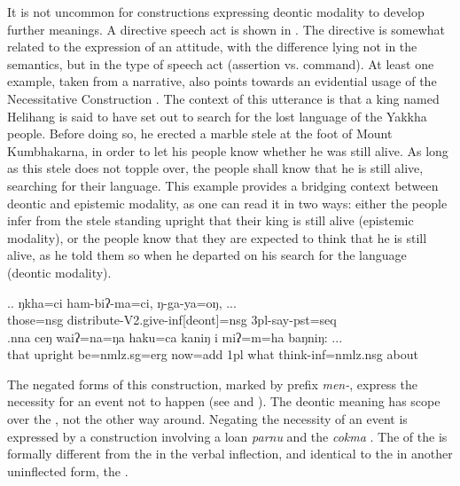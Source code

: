 	
It is not uncommon for constructions expressing deontic modality to develop further meanings. A directive speech act is shown in  \Next[a]. The directive is somewhat related to the expression of an attitude, with the difference lying not in the semantics, but in the type of speech act (assertion vs. command). At least one example, taken from a narrative, also points towards an evidential usage of the Necessitative Construction \Next[b]. The context of this utterance is that a king named Helihang is said to have set out to search for the lost language of the Yakkha people. Before doing so, he erected a marble stele at the foot of Mount Kumbhakarna, in order to let his people know whether he was still alive. As long as this stele does not topple over, the people shall know that he is still alive, searching for their language. This example provides a bridging context between deontic and epistemic modality, as one can read it in two ways: either the people infer from the stele standing upright that their king is still alive (epistemic modality), or the people know that they are expected to think that he is still alive, as he told them so when he departed on his search for the language (deontic modality). 


\ex.\ag. ŋkha=ci ham-biʔ-ma=ci,  ŋ-ga-ya=oŋ, ...\\
those{\sc =nsg} distribute{\sc -V2.give-inf[deont]=nsg} {\sc 3pl-}say{\sc -pst=seq}\\
\bg.nna  ceŋ    waiʔ=na=ŋa      haku=ca   kaniŋ i    miʔ=m=ha baŋniŋ: ...\\
that upright be{\sc [3sg]=nmlz.sg=erg} now{\sc =add} {\sc 1pl} what think{\sc -inf=nmlz.nsg} about\\
 


The negated forms of this construction, marked by prefix \emph{men-}, express the necessity for an event not to happen (see \Next[a] and \Next[b]). The deontic meaning has scope over the , not the other  way around. Negating  the  necessity of an event is expressed by a construction involving a  loan \emph{parnu}  and the  \emph{cokma}  \Next[c].  The  of the  is formally different from the  in the verbal inflection, and identical to the  in another uninflected form, the .

